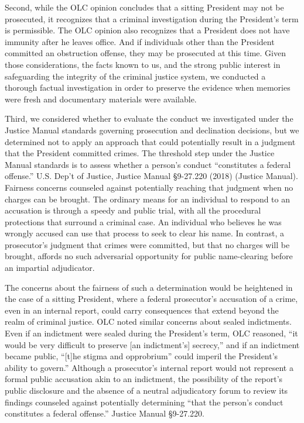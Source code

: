 Second, while the OLC opinion concludes that a sitting President may not be prosecuted, it recognizes that a criminal investigation during the President’s term is permissible.%
The OLC opinion also recognizes that a President does not have immunity after he leaves office.%
And if individuals other than the President committed an obstruction offense, they may be prosecuted at this time.
Given those considerations, the facts known to us, and the strong public interest in safeguarding the integrity of the criminal justice system, we conducted a thorough factual investigation in order to preserve the evidence when memories were fresh and documentary materials were available.

Third, we considered whether to evaluate the conduct we investigated under the Justice Manual standards governing prosecution and declination decisions, but we determined not to apply an approach that could potentially result in a judgment that the President committed crimes.
The threshold step under the Justice Manual standards is to assess whether a person’s conduct
“constitutes a federal offense.”
U.S. Dep’t of Justice, Justice Manual \S 9-27.220 (2018) (Justice Manual).
Fairness concerns counseled against potentially reaching that judgment when no charges can be brought.
The ordinary means for an individual to respond to an accusation is through a speedy and public trial, with all the procedural protections that surround a criminal case.
An individual who believes he was wrongly accused can use that process to seek to clear his name.
In contrast, a prosecutor’s judgment that crimes were committed, but that no charges will be brought, affords no such adversarial opportunity for public name-clearing before an impartial adjudicator.%

The concerns about the fairness of such a determination would be heightened in the case of a sitting President, where a federal prosecutor’s accusation of a crime, even in an internal report, could carry consequences that extend beyond the realm of criminal justice.
OLC noted similar concerns about sealed indictments.
Even if an indictment were sealed during the President’s term, OLC reasoned, “it would be very difficult to preserve [an indictment’s] secrecy,” and if an indictment became public, “[t]he stigma and opprobrium” could imperil the President’s ability to govern.”%
Although a prosecutor’s internal report would not represent a formal public accusation akin to an indictment, the possibility of the report’s public disclosure and the absence of a neutral adjudicatory forum to review its findings counseled against potentially determining “that the person’s conduct constitutes a federal offense.”
Justice Manual \S 9-27.220.

